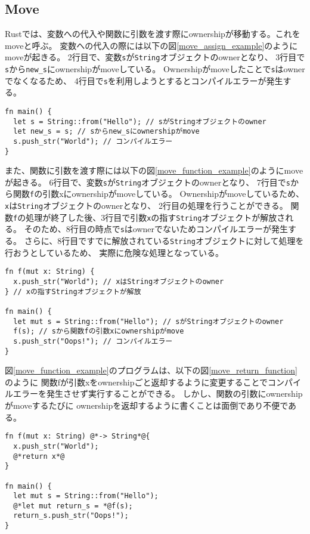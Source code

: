 \documentclass{sumiilab-paper}
\theoremstyle{mystyle}
\numberwithin{definition}{chapter} %
\begin{document}
\subsection{Move}
Rustでは、変数への代入や関数に引数を渡す際にownershipが移動する。これをmoveと呼ぶ。
変数への代入の際には以下の図\ref{move_assign_example}のようにmoveが起きる。
2行目で、変数\texttt{s}が\texttt{String}オブジェクトのownerとなり、
3行目で\texttt{s}から\texttt{new\_s}にownershipがmoveしている。
Ownershipがmoveしたことで\texttt{s}はownerでなくなるため、
4行目で\texttt{s}を利用しようとするとコンパイルエラーが発生する。
\begin{lstlisting}[caption=変数への代入でmoveが起こる例,
  label=move_assign_example, captionpos=b]
fn main() {
  let s = String::from("Hello"); // sがStringオブジェクトのowner
  let new_s = s; // sからnew_sにownershipがmove
  s.push_str("World"); // コンパイルエラー
}    
\end{lstlisting}
また、関数に引数を渡す際には以下の図\ref{move_function_example}のようにmoveが起きる。
6行目で、変数\texttt{s}が\texttt{String}オブジェクトのownerとなり、
7行目で\texttt{s}から関数\texttt{f}の引数xにownershipがmoveしている。
Ownershipがmoveしているため、\texttt{x}は\texttt{String}オブジェクトのownerとなり、
2行目の処理を行うことができる。
関数\texttt{f}の処理が終了した後、3行目で引数\texttt{x}の指す\texttt{String}オブジェクトが解放される。
そのため、8行目の時点で\texttt{s}はownerでないためコンパイルエラーが発生する。
さらに、8行目ですでに解放されている\texttt{String}オブジェクトに対して処理を行おうとしているため、
実際に危険な処理となっている。
\begin{lstlisting}[caption=関数に引数を渡す際にmoveが起こる例, 
label=move_function_example, captionpos=b]
fn f(mut x: String) {
  x.push_str("World"); // xはStringオブジェクトのowner
} // xの指すStringオブジェクトが解放

fn main() {
  let mut s = String::from("Hello"); // sがStringオブジェクトのowner
  f(s); // sから関数fの引数xにownershipがmove
  s.push_str("Oops!"); // コンパイルエラー
}
\end{lstlisting}
図\ref{move_function_example}のプログラムは、以下の図\ref{move_return_function}のように
関数fが引数xをownershipごと返却するように変更することでコンパイルエラーを発生させず実行することができる。
しかし、関数の引数にownershipがmoveするたびに
ownershipを返却するように書くことは面倒であり不便である。
\begin{lstlisting}[caption=危険な処理を避けた例, 
  label=move_return_function, captionpos=b]
fn f(mut x: String) @*-> String*@{
  x.push_str("World");
  @*return x*@
}
  
fn main() {
  let mut s = String::from("Hello");
  @*let mut return_s = *@f(s);
  return_s.push_str("Oops!");
}
\end{lstlisting}
\end{document}
